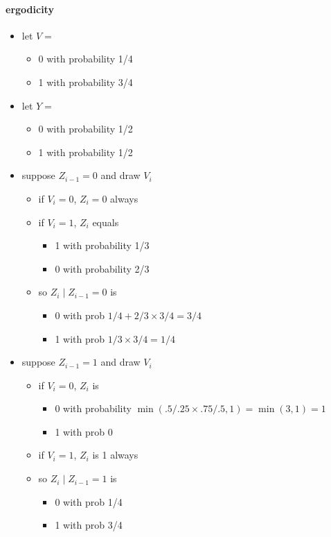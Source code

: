 \paragraph{ergodicity}
\begin{itemize}
\item let $V =$
\begin{itemize}
\item 0 with probability 1/4
\item 1 with probability 3/4
\end{itemize}
\item let $Y =$
\begin{itemize}
\item 0 with probability 1/2
\item 1 with probability 1/2
\end{itemize}
\item suppose $Z_{i-1} = 0$ and draw $V_i$
\begin{itemize}
\item if $V_i = 0$, $Z_i = 0$ always
\item if $V_i = 1$, $Z_i$ equals
\begin{itemize}
\item 1 with probability 1/3
\item 0 with probability 2/3
\end{itemize}
\item so $Z_i \mid Z_{i-1} = 0$ is
\begin{itemize}
\item 0 with prob $1/4 + 2/3 \times 3/4 = 3/4$
\item 1 with prob $1/3 \times 3/4 = 1/4$
\end{itemize}
\end{itemize}
\item suppose $Z_{i-1} = 1$ and draw $V_i$
\begin{itemize}
\item if $V_i = 0$, $Z_i$ is
\begin{itemize}
\item 0 with probability $\min(.5/.25 \times .75/.5, 1) =
            \min(3,1) = 1$
\item 1 with prob 0
\end{itemize}
\item if $V_i = 1$, $Z_i$ is 1 always
\item so $Z_i \mid Z_{i-1} = 1$ is
\begin{itemize}
\item 0 with prob 1/4
\item 1 with prob 3/4

\end{itemize}
\end{itemize}
\end{itemize}
